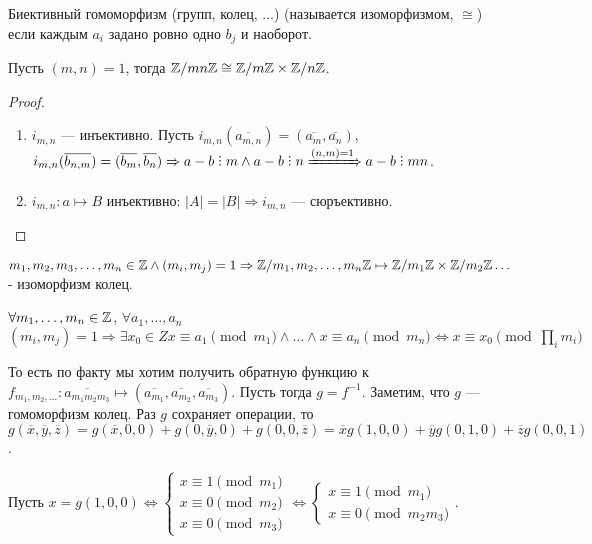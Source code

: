 \begin{definition}
    Биективный гомоморфизм (групп, колец, ...) (называется изоморфизмом, $\cong$) если каждым $a_i$ задано ровно одно  $b_j$ и наоборот.
\end{definition}
\begin{theorem}
    Пусть $(m, n)=1$, тогда $\mathbb{Z} / mn \mathbb{Z} \cong \mathbb{Z} / m\mathbb{Z} \times \mathbb{Z} / n \mathbb{Z}$.
\end{theorem}
\begin{proof}
    \slashn
    \begin{enumerate}
        \item $i_{m,n}$ --- инъективно. Пусть $i_{m,n}(\overline{a_{m,n}}) = (\overline{a_m}, \overline{a_n})$,  $i_{m,n}(\overline{b_{n, m}}) = (\overline{b_m}, \overline{b_n}) \Rightarrow  a-b \divby m \land a-b\divby n \xRightarrow{(n, m) = 1} a - b \divby mn$.
        \item $i_{m, n}: a \mapsto B$ инъективно: $|A| = |B| \Rightarrow i_{m, n}$ --- сюръективно.  
    \end{enumerate}
\end{proof}
\begin{theorem}[КТО 2]
    $m_1,m_2,m_3,\ldots,m_n \in \mathbb{Z} \land (m_i, m_j) = 1 \Rightarrow \mathbb{Z} / m_1,m_2,\ldots,m_n \mathbb{Z} \mapsto \mathbb{Z} / m_1\mathbb{Z} \times \mathbb{Z} / m_2\mathbb{Z} \ldots$ - изоморфизм колец. 
\end{theorem}
\begin{theorem}
    $\forall m_1, \ldots, m_n \in \mathbb{Z}$, $\forall a_1, \ldots, a_n$ $(m_i, m_j) = 1 \Rightarrow \exists x_0 \in Z x \equiv a_1 \pmod{m_1} \land \ldots \land x \equiv a_n \pmod{m_n} \iff x \equiv x_0 \pmod {\prod_i m_i}$
\end{theorem}
\slashn
То есть по факту мы хотим получить обратную функцию к $f_{m_1,m_2,\ldots}: \overline{a_{m_1m_2m_3}} \mapsto (\overline{a_{m_1}}, \overline{a_{m_2}}, \overline{a_{m_3}})$. Пусть тогда $g=f^{-1}$. Заметим, что  $g$ --- гомоморфизм колец. Раз  $g$ сохраняет операции, то  $g(\overline{x}, \overline{y}, \overline{z}) = g(\overline{x}, 0, 0) + g(0, \overline{y}, 0) + g(0, 0, \overline{z}) = \overline{x}g(1, 0, 0) + \overline{y}g(0, 1, 0) + \overline{z}g(0, 0, 1)$.

Пусть  $x=g(1, 0, 0) \iff \begin{cases} x \equiv 1 \pmod{m_1} \\ x \equiv 0 \pmod{m_2} \\ x \equiv 0 \pmod{m_3} \end{cases} \iff \begin{cases} x \equiv 1 \pmod{m_1} \\ x \equiv 0 \pmod{m_2m_3} \end{cases}$.

